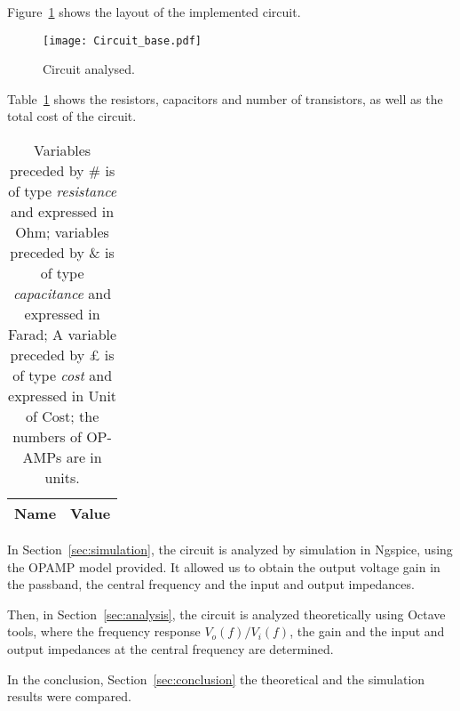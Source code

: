 Figure~\ref{fig:Circuit_Base} shows the layout of the implemented circuit.

\begin{figure}[h]
	\centering
	\texttt{[image: Circuit\_base.pdf]}
	\caption{Circuit analysed.}
	\label{fig:Circuit_Base}
\end{figure}

\newpage

Table~\ref{tab:VALUES} shows the resistors, capacitors and number of transistors, as well as the total cost of the circuit.

\begin{table}[h]
  \centering
  \begin{tabular}{|l|r|}
    \hline    
    {\bf Name} & {\bf Value} \\ \hline
    
  \end{tabular}
  \caption{Variables preceded by \# is of type {\em resistance} and expressed in Ohm; variables preceded by \& is of type {\em capacitance} and expressed in Farad; A variable preceded by £ is of type {\it cost} and expressed in Unit of Cost; the numbers of OP-AMPs are in units.}
  \label{tab:VALUES}
\end{table}

In Section~\ref{sec:simulation}, the circuit is analyzed by simulation in Ngspice, using the OPAMP model provided. It allowed us to obtain the output voltage gain in the passband, the central frequency and the input and output impedances.	
\par
Then, in Section~\ref{sec:analysis}, the circuit is analyzed theoretically using Octave tools, where the frequency response $V_o(f)/V_i(f)$, the  gain and the input and output impedances at the central frequency are determined.
\par
In the conclusion, Section~\ref{sec:conclusion} the theoretical and the simulation results were compared.